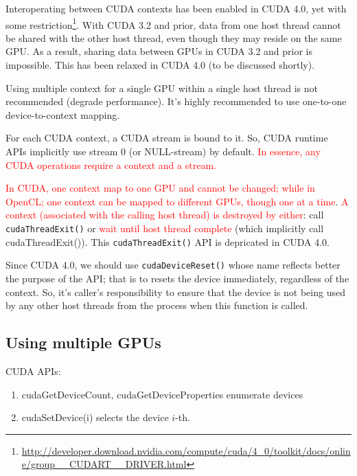 Interoperating between CUDA contexts has been enabled in CUDA 4.0, yet with some
restriction\footnote{\url{http://developer.download.nvidia.com/compute/cuda/4_0/toolkit/docs/online/group__CUDART__DRIVER.html}}.
With CUDA 3.2 and prior, data from one host thread cannot be shared with the
other host thread, even though they may reside on the same GPU. As a result,
sharing data between GPUs in CUDA 3.2 and prior is impossible. This has been
relaxed in CUDA 4.0 (to be discussed shortly).

\begin{framed}
Using multiple context for a single GPU within a single host thread is not
recommended (degrade performance). It's highly recommended to use one-to-one
device-to-context
mapping.
\end{framed}

For each CUDA context, a CUDA stream is bound to it. So, CUDA runtime
APIs implicitly use stream 0 (or NULL-stream) by default.  \textcolor{red}{In
essence, any CUDA operations require a context and a stream.}

\begin{framed}
\textcolor{red}{In CUDA, one context map to one GPU and cannot be changed; while
in OpenCL; one context can be mapped to different GPUs, though one at a time}. 
\textcolor{red}{A context (associated with the calling host  thread) is
destroyed by either}: call \verb!cudaThreadExit()! or  \textcolor{red}{wait
until host thread complete} (which implicitly call cudaThreadExit()). This
\verb!cudaThreadExit()! API is depricated in CUDA 4.0. 

Since CUDA 4.0, we should use \verb!cudaDeviceReset()! whose name reflects 
better the purpose of the API; that is to resets the device
immediately, regardless of the context. So, it's caller's responsibility to ensure that the device is not being used by any other host
threads from the process when this function is called.
\end{framed}

\subsection{Using multiple GPUs}
\label{sec:using_multi-GPUs}

CUDA APIs: 
\begin{enumerate}
  
  \item cudaGetDeviceCount, cudaGetDeviceProperties enumerate devices
  
  \item   cudaSetDevice(i) selects the  device $i$-th.
\end{enumerate}


